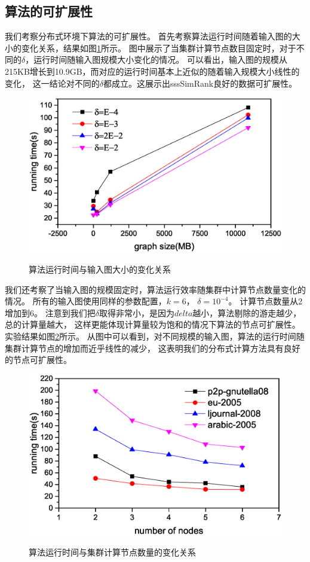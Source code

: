 \documentclass[master]{njuthesis}
\begin{document}
\subsection{算法的可扩展性}
我们考察分布式环境下算法的可扩展性。 首先考察算法运行时间随着输入图的大小的变化关系，结果如图\ref{fig:ch1:data_scalable}所示。
图中展示了当集群计算节点数目固定时，对于不同的$\delta$，运行时间随输入图规模大小变化的情况。 
可以看出，输入图的规模从215KB增长到10.9GB，而对应的运行时间基本上近似的随着输入规模大小线性的变化，
这一结论对不同的$\delta$都成立。这展示出sssSimRank良好的数据可扩展性。
\begin{figure}[h]
  \centering
  \includegraphics[width= 1\textwidth]{figure/data_scalability.eps}\\
  \caption{算法运行时间与输入图大小的变化关系}\label{fig:ch1:data_scalable}
\end{figure}

我们还考察了当输入图的规模固定时，算法运行效率随集群中计算节点数量变化的情况。
所有的输入图使用同样的参数配置，$k=6$， $\delta=10^{-4}$。 计算节点数量从2增加到6。
注意到我们把$\delta$取得非常小，是因为$delta$越小，算法剔除的游走越少，总的计算量越大，
这样更能体现计算量较为饱和的情况下算法的节点可扩展性。实验结果如图\ref{fig:ch1:node_scalable}所示。
从图中可以看到，对不同规模的输入图，算法的运行时间随集群计算节点的增加而近乎线性的减少，
这表明我们的分布式计算方法具有良好的节点可扩展性。
\begin{figure}[h]
  \centering
  \includegraphics[width= 1\textwidth]{figure/node_scalability.eps}\\
  \caption{算法运行时间与集群计算节点数量的变化关系}\label{fig:ch1:node_scalable}
\end{figure}
\end{document}
